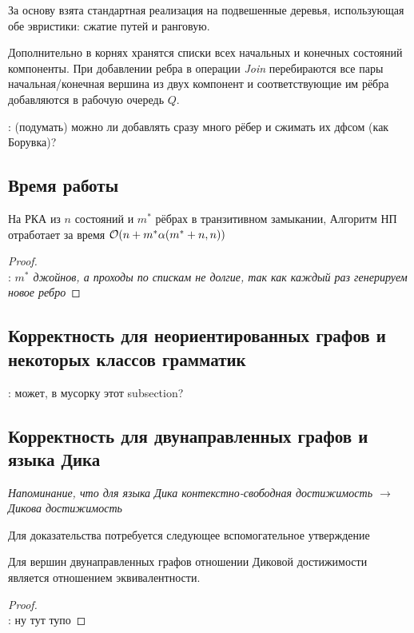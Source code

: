 За основу взята стандартная реализация \cite{Hopcroft1973} на подвешенные деревья, использующая обе эвристики: сжатие путей и ранговую. 


Дополнительно в корнях хранятся списки всех начальных и конечных состояний компоненты. При добавлении ребра в операции \textit{Join} перебираются все пары начальная/конечная вершина из двух компонент и соответствующие им рёбра добавляются в рабочую очередь $Q$. 

\TODO: (подумать) можно ли добавлять сразу много рёбер и сжимать их дфсом (как Борувка)?

\subsection{Время работы}

\begin{theorem}
На РКА из $n$ состояний и $m^{*}$ рёбрах в транзитивном замыкании, Алгоритм НП отработает за время $\mathcal{O}(n + m^{*} \alpha(m^{*} + n, n))$
\end{theorem}

\begin{proof}
~\\
\TODO: \textit{$m^{*}$ джойнов, а проходы по спискам не долгие, так как каждый раз генерируем новое ребро}
\end{proof}

\subsection{Корректность для неориентированных графов и некоторых классов грамматик}

\TODO: может, в мусорку этот subsection?

\subsection{Корректность для двунаправленных графов и языка Дика}

\textit{Напоминание, что для языка Дика контекстно-свободная достижимость $\to$ Дикова достижимость}

Для доказательства потребуется следующее вспомогательное утверждение

\begin{lemma}
    Для вершин двунаправленных графов отношении Диковой достижимости является отношением эквивалентности.
\end{lemma}
\begin{proof}
~\\
\TODO: ну тут тупо

\end{proof}

